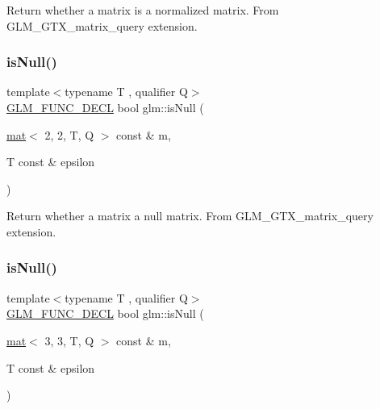 Return whether a matrix is a normalized matrix. From G\+L\+M\+\_\+\+G\+T\+X\+\_\+matrix\+\_\+query extension. \mbox{\label{group__gtx__matrix__query_ga9790ec222ce948c0ff0d8ce927340dba}} 
\subsubsection{\texorpdfstring{is\+Null()}{isNull()}\hspace{0.1cm}{\footnotesize\ttfamily [1/3]}}
{\footnotesize\ttfamily template$<$typename T , qualifier Q$>$ \\
\mbox{\hyperlink{setup_8hpp_ab2d052de21a70539923e9bcbf6e83a51}{G\+L\+M\+\_\+\+F\+U\+N\+C\+\_\+\+D\+E\+CL}} bool glm\+::is\+Null (\begin{DoxyParamCaption}\item[{\mbox{\hyperlink{structglm_1_1mat}{mat}}$<$ 2, 2, T, Q $>$ const \&}]{m,  }\item[{T const \&}]{epsilon }\end{DoxyParamCaption})}

Return whether a matrix a null matrix. From G\+L\+M\+\_\+\+G\+T\+X\+\_\+matrix\+\_\+query extension. \mbox{\label{group__gtx__matrix__query_gae14501c6b14ccda6014cc5350080103d}} 
\subsubsection{\texorpdfstring{is\+Null()}{isNull()}\hspace{0.1cm}{\footnotesize\ttfamily [2/3]}}
{\footnotesize\ttfamily template$<$typename T , qualifier Q$>$ \\
\mbox{\hyperlink{setup_8hpp_ab2d052de21a70539923e9bcbf6e83a51}{G\+L\+M\+\_\+\+F\+U\+N\+C\+\_\+\+D\+E\+CL}} bool glm\+::is\+Null (\begin{DoxyParamCaption}\item[{\mbox{\hyperlink{structglm_1_1mat}{mat}}$<$ 3, 3, T, Q $>$ const \&}]{m,  }\item[{T const \&}]{epsilon }\end{DoxyParamCaption})}

